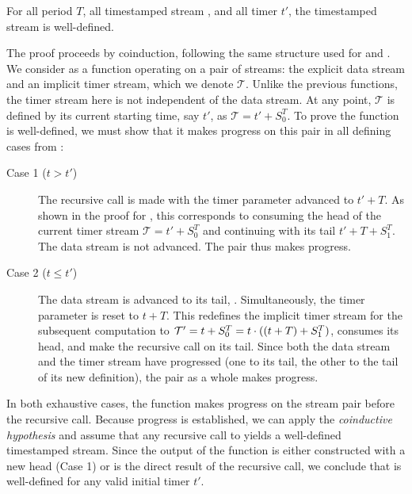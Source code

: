 \begin{lemma}
    For all period $T$, all timestamped stream \ts, and all timer $t'$, the timestamped stream
     is well-defined.
\end{lemma}
\begin{skippableproof}
    The proof proceeds by coinduction, following the same structure used for  and
    . We consider  as a function operating on a pair of streams: the
    explicit data stream \ts and an implicit timer stream, which we denote $\mathcal{T}$. Unlike the
    previous functions, the timer stream here is not independent of the data stream. At any point,
    $\mathcal{T}$ is defined by its current starting time, say $t'$, as $\mathcal{T} = t' + S_0^T$.
    To prove the function is well-defined, we must show that it makes progress on this pair in
    all defining cases from :
    \begin{description}
        \item[Case 1 ($t > t'$)] The recursive call is made with the timer parameter advanced to
              $t' + T$. As shown in the proof for , this corresponds to consuming
              the head of the current timer stream $\mathcal{T} = t' + S_0^T$ and continuing with
              its tail $t'+T + S_1^T$. The data stream \ts is not advanced. The pair thus makes
              progress.

        \item[Case 2 ($t \le t'$)] The data stream is advanced to its tail, \ts. Simultaneously,
              the timer parameter is reset to $t + T$. This redefines the implicit timer stream for
              the subsequent computation to $\mathcal{T}' = t + S_0^T = t \cdot ((t+T) + S_1^T)$,
              consumes its head, and make the recursive call on its tail. Since both the data
              stream and the timer stream have progressed (one to its tail, the other to the tail of
              its new definition), the pair as a whole makes progress.
    \end{description}
    In both exhaustive cases, the function makes progress on the stream pair before the recursive
    call. Because progress is established, we can apply the \emph{coinductive hypothesis} and assume
    that any recursive call to  yields a well-defined timestamped stream. Since the
    output of the function is either constructed with a new head (Case 1) or is the direct result of
    the recursive call, we conclude that  is well-defined for any valid initial
    timer $t'$.
\end{skippableproof}

